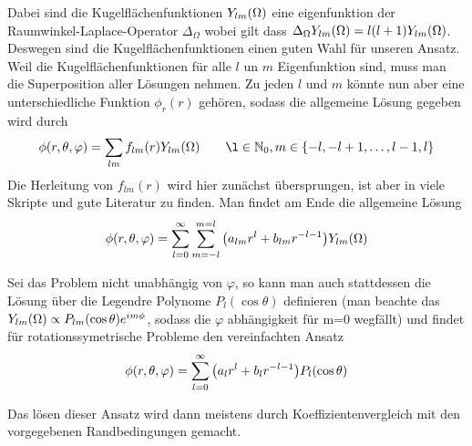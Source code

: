 Dabei sind die Kugelflächenfunktionen $Y_{lm}(\Omega)$ eine eigenfunktion der
Raumwinkel-Laplace-Operator $\Delta_\Omega$ wobei gilt dass
$\Delta_\Omega Y_{lm}(\Omega)=l(l+1)Y_{lm}(\Omega)$. Deswegen sind die Kugelflächenfunktionen einen
guten Wahl für unseren Ansatz. Weil die Kugelflächenfunktionen für alle
$l$ un $m$ Eigenfunktion sind, muss man die Superposition aller Lösungen
nehmen. Zu jeden $l$ und $m$ könnte nun aber eine unterschiedliche Funktion
$\phi_r(r)$ gehören, sodass die allgemeine Lösung gegeben wird durch
\begin{equation*}
  \phi(r,\theta,\varphi) = \sum_{lm} f_{lm}(r)\Y \qquad
  \l\in\mathbb{N}_0, m\in\{-l,-l+1,\ldots,l-1,l\}
\end{equation*}
Die Herleitung von $f_{lm}(r)$ wird hier zunächst übersprungen, ist aber
in viele Skripte und gute Literatur zu finden. Man findet am Ende die
allgemeine Lösung
\begin{equation}
  \phi(r,\theta,\varphi)=\sum_{l=0}^\infty\sum_{m=-l}^{m=l}
  \qty(a_{lm}r^l + b_{lm}r^{-l-1})Y_{lm}(\Omega)
\end{equation}

Sei das Problem nicht unabhängig von $\varphi$, so kann man auch stattdessen
die Lösung über die Legendre Polynome $P_l(\cos\theta)$ definieren 
(man beachte das $Y_{lm}(\Omega)\propto P_{lm}(\cos\theta)e^{im\phi}$, sodass die
$\varphi$ abhängigkeit für m=0 wegfällt) und findet für rotationssymetrische
Probleme den vereinfachten Ansatz
\begin{equation}
  \phi(r,\theta,\varphi)=\sum_{l=0}^\infty
  \qty(a_{l}r^l + b_{l}r^{-l-1})P_l(\cos\theta)
\end{equation}

Das lösen dieser Ansatz wird dann meistens durch Koeffizientenvergleich
mit den vorgegebenen Randbedingungen gemacht.
